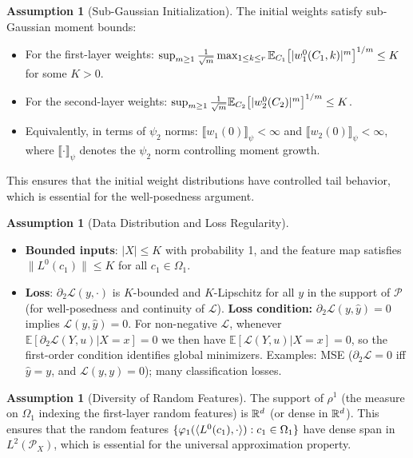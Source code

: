\documentclass[nohyperref]{article}
\theoremstyle{plain}
\theoremstyle{definition}
\newtheorem{assumption}[theorem]{Assumption}
\theoremstyle{remark}
\begin{document}
\begin{assumption}[Sub-Gaussian Initialization]
\label{assump:init}
The initial weights satisfy sub-Gaussian moment bounds:
\begin{itemize}
\item For the first-layer weights: $\sup_{m\ge 1}\frac{1}{\sqrt{m}}\max_{1\le k\le r}\mathbb{E}_{C_1}\!\left[|w_1^0(C_1,k)|^m\right]^{1/m}\le K$ for some $K>0$.
\item For the second-layer weights: $\sup_{m\ge 1}\frac{1}{\sqrt{m}}\mathbb{E}_{C_2}\!\left[|w_2^0(C_2)|^m\right]^{1/m}\le K$.
\item Equivalently, in terms of $\psi_2$ norms: $\llbracket w_1(0)\rrbracket_{\psi}<\infty$ and $\llbracket w_2(0)\rrbracket_{\psi}<\infty$, where $\llbracket\cdot\rrbracket_{\psi}$ denotes the $\psi_2$ norm controlling moment growth.
\end{itemize}
This ensures that the initial weight distributions have controlled tail behavior, which is essential for the well-posedness argument.
\end{assumption}

\begin{assumption}[Data Distribution and Loss Regularity]
\label{assump:data}
\begin{itemize}
\item \textbf{Bounded inputs}: $|X|\le K$ with probability 1, and the feature map satisfies $\|L^0(c_1)\|\le K$ for all $c_1\in\Omega_1$.
\item \textbf{Loss}: $\partial_2\mathcal{L}(y,\cdot)$ is $K$-bounded and $K$-Lipschitz for all $y$ in the support of $\mathcal{P}$ (for well-posedness and continuity of $\mathscr{L}$). \textbf{Loss condition:} $\partial_2\mathcal{L}(y,\hat{y})=0$ implies $\mathcal{L}(y,\hat{y})=0$. For non-negative $\mathcal{L}$, whenever $\mathbb{E}[\partial_2\mathcal{L}(Y,u)|X=x]=0$ we then have $\mathbb{E}[\mathcal{L}(Y,u)|X=x]=0$, so the first-order condition identifies global minimizers. Examples: MSE ($\partial_2\mathcal{L}=0$ iff $\hat{y}=y$, and $\mathcal{L}(y,y)=0$); many classification losses.
\end{itemize}
\end{assumption}

\begin{assumption}[Diversity of Random Features]
\label{assump:diversity}
The support of $\rho^1$ (the measure on $\Omega_1$ indexing the first-layer random features) is $\R^d$ (or dense in $\R^d$). This ensures that the random features $\{\varphi_1(\langle L^0(c_1), \cdot \rangle): c_1\in\Omega_1\}$ have dense span in $L^2(\mathcal{P}_X)$, which is essential for the universal approximation property.
\end{assumption}
\end{document}
